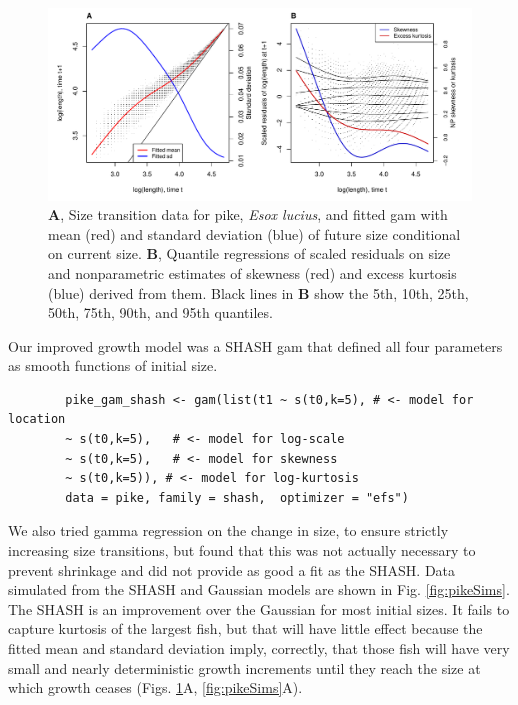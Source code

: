 \documentclass[12pt]{article}
\begin{document}
\begin{spacing}{1.35}
	\begin{figure}[tbp]
		\centering
		\includegraphics[width=1.0\textwidth]{figures/pike_resid_diagnostics.pdf}
		\caption{\textbf{A}, Size transition data for pike, \emph{Esox lucius}, and fitted gam with mean (red) and standard deviation (blue) of future size conditional on current size.  \textbf{B}, Quantile regressions of scaled residuals on size and nonparametric estimates of skewness (red) and excess kurtosis (blue) derived from them. Black lines in \textbf{B} show the 5th, 10th, 25th, 50th, 75th, 90th, and 95th quantiles.}
		\label{fig:pike_diagnostics}
	\end{figure} 
	
	Our improved growth model was a SHASH gam that defined all four parameters as smooth functions of initial size.
	\begin{lstlisting}
		pike_gam_shash <- gam(list(t1 ~ s(t0,k=5), # <- model for location 
		~ s(t0,k=5),   # <- model for log-scale
		~ s(t0,k=5),   # <- model for skewness
		~ s(t0,k=5)), # <- model for log-kurtosis
		data = pike, family = shash,  optimizer = "efs")
	\end{lstlisting}
	We also tried gamma regression on the change in size, to ensure strictly increasing size transitions, but found that this was not actually necessary to prevent shrinkage and did not provide as good a fit as the SHASH. 
	Data simulated from the SHASH and Gaussian models are shown in Fig. \ref{fig:pikeSims}. 
	The SHASH is an improvement over the Gaussian for most initial sizes. 
	It fails to capture kurtosis of the largest fish, but that will have little effect because the fitted mean and standard deviation imply, correctly, that those
	fish will have very small and nearly deterministic growth increments until they reach the size at which growth ceases (Figs. \ref{fig:pike_diagnostics}A, \ref{fig:pikeSims}A).  
	

\end{spacing}
\end{document}
